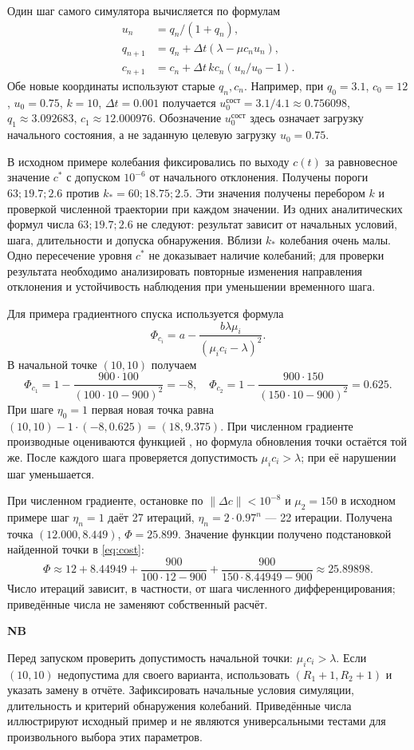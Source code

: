 \documentclass[12pt,a4paper]{article}
\newenvironment{notabene}
  {\par\medskip
   \begin{lrbox}{\nbbox}%
   \begin{minipage}{\dimexpr\linewidth-20pt\relax}
   {\fontsize{13}{16}\selectfont\bfseries
    \color{black!85}NB\par}
   \vspace{4pt}
   \noindent\ignorespaces}
  {\par\end{minipage}%
   \end{lrbox}%
   \noindent
   \begingroup
   \setlength{\fboxsep}{10pt}%
   \colorbox{blue!5}{\usebox{\nbbox}}%
   \endgroup
   \par\medskip}
\begin{document}
Один шаг самого симулятора вычисляется по формулам
\[
\begin{aligned}
u_n&=q_n/(1+q_n),\\
q_{n+1}&=q_n+\Delta t(\lambda-\mu c_nu_n),\\
c_{n+1}&=c_n+\Delta t\,kc_n(u_n/u_0-1).
\end{aligned}
\]
Обе новые координаты используют старые $q_n,c_n$.
Например, при $q_0=3.1$, $c_0=12$, $u_0=0.75$, $k=10$, $\Delta t=0.001$
получается $u_0^{\mathrm{сост}}=3.1/4.1\approx0.756098$,
$q_1\approx3.092683$, $c_1\approx12.000976$.
Обозначение $u_0^{\mathrm{сост}}$ здесь означает загрузку начального состояния,
а не заданную целевую загрузку $u_0=0.75$.

В исходном примере колебания фиксировались по выходу $c(t)$ за равновесное
значение $c^*$ с допуском $10^{-6}$ от начального отклонения.
Получены пороги $63;19.7;2.6$ против $k_*=60;18.75;2.5$.
Эти значения получены перебором $k$ и проверкой численной траектории
при каждом значении. Из одних аналитических формул числа $63;19.7;2.6$
не следуют: результат зависит от начальных условий, шага, длительности
и допуска обнаружения. Вблизи $k_*$ колебания очень малы.
Одно пересечение уровня $c^*$ не доказывает наличие колебаний;
для проверки результата необходимо анализировать повторные изменения
направления отклонения и устойчивость наблюдения при уменьшении временного шага.

Для примера градиентного спуска используется формула
\[
\Phi_{c_i}=a-\frac{b\lambda\mu_i}{(\mu_ic_i-\lambda)^2}.
\]
В начальной точке $(10,10)$ получаем
\[
\Phi_{c_1}=1-\frac{900\cdot100}{(100\cdot10-900)^2}=-8,
\quad
\Phi_{c_2}=1-\frac{900\cdot150}{(150\cdot10-900)^2}=0.625.
\]
При шаге $\eta_0=1$ первая новая точка равна
$(10,10)-1\cdot(-8,0.625)=(18,9.375)$.
При численном градиенте производные оцениваются функцией ,
но формула обновления точки остаётся той же.
После каждого шага проверяется допустимость $\mu_ic_i>\lambda$;
при её нарушении шаг уменьшается.

При численном градиенте, остановке по $\|\Delta c\|<10^{-8}$ и $\mu_2=150$
в исходном примере шаг $\eta_n=1$ даёт 27 итераций,
$\eta_n=2\cdot0.97^n$ --- 22 итерации. Получена точка
$(12.000,8.449)$, $\Phi=25.899$.
Значение функции получено подстановкой найденной точки в \eqref{eq:cost}:
\[
\Phi\approx12+8.44949+
\frac{900}{100\cdot12-900}+\frac{900}{150\cdot8.44949-900}
\approx25.89898.
\]
Число итераций зависит, в частности, от шага численного дифференцирования;
приведённые числа не заменяют собственный расчёт.
\begin{notabene}
Перед запуском проверить допустимость начальной точки: $\mu_i c_i>\lambda$.
Если $(10,10)$ недопустима для своего варианта, использовать
$(R_1+1,R_2+1)$ и указать замену в отчёте.
Зафиксировать начальные условия симуляции, длительность и критерий обнаружения
колебаний. Приведённые числа иллюстрируют исходный пример и не являются
универсальными тестами для произвольного выбора этих параметров.
\end{notabene}
\end{document}
